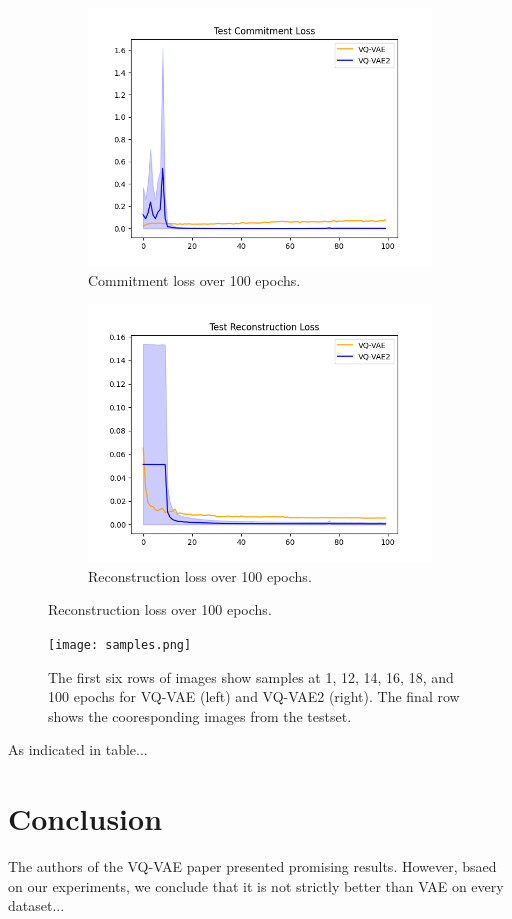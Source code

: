 \documentclass{article}
\begin{document}
\begin{figure}
    \centering
    \begin{subfigure}{.49\linewidth}
        \centering
        \includegraphics[width=\linewidth]{commit.png}
        \caption{Commitment loss over 100 epochs.}
    \end{subfigure}
    \begin{subfigure}{.49\linewidth}
        \centering
        \includegraphics[width=\linewidth]{recon.png}
        \caption{Reconstruction loss over 100 epochs.}
    \end{subfigure}
\end{figure}

\begin{figure}
    \centering
    \texttt{[image: samples.png]}
    \caption{The first six rows of images show samples at 1, 12, 14, 16, 18, and 100 epochs for VQ-VAE (left) and VQ-VAE2 (right). The final row shows the cooresponding images from the testset.}
\end{figure}

As indicated in table...

\section{Conclusion}

The authors of the VQ-VAE paper presented promising results. However, bsaed on our experiments, we conclude that it is not strictly better than VAE on every dataset...
\end{document}
